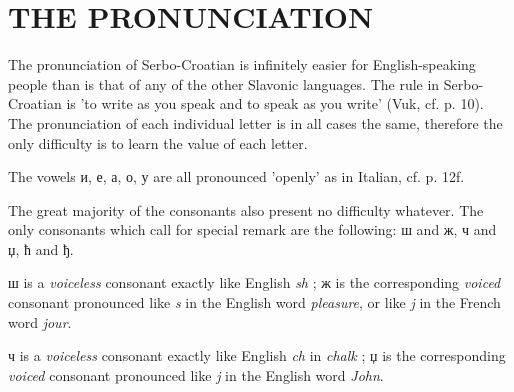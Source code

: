 \chapter{THE PRONUNCIATION}

        The pronunciation of Serbo-Croatian is infinitely easier for
        English-speaking people than is that of any of the other Slavonic
        languages. The rule in Serbo-Croatian is 'to write as you speak and to
        speak as you write' (Vuk, cf. p. 10). The pronunciation of each
        individual letter is in all cases the same, therefore the only
        difficulty is to learn the value of each letter.

        The vowels {и, е, а, о, у} are all pronounced 'openly' as
        in Italian, cf. p. 12f.

        The great majority of the consonants also present no difficulty
        whatever. The only consonants which call for special remark are the
        following: ш and ж, ч
        and џ, ћ and ђ.

        ш is a \textit{voiceless} consonant exactly like English \textit{sh}
        ; ж is the corresponding \textit{voiced} consonant pronounced
        like \textit{s} in the English word \textit{pleasure}, or like \textit{j} in
        the French word \textit{jour}.

        ч is a \textit{voiceless} consonant exactly like English
        \textit{ch} in \textit{chalk} ; џ is the corresponding
        \textit{voiced} consonant pronounced like \textit{j} in the English
        word \textit{John}.

